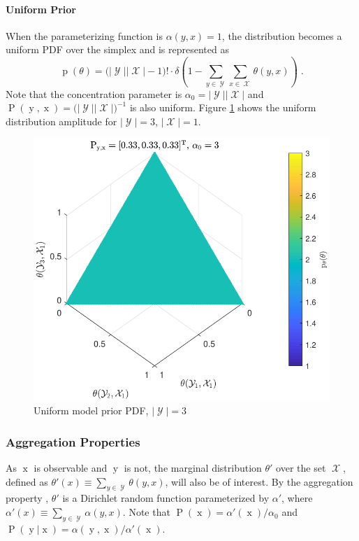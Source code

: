 \documentclass[12pt]{article}
\DeclareMathOperator{\xrm}{\mathrm{x}}
\DeclareMathOperator{\yrm}{\mathrm{y}}
\DeclareMathOperator{\Prm}{\mathrm{P}}
\DeclareMathOperator{\prm}{\mathrm{p}}
\DeclareMathOperator{\Xcal}{\mathcal{X}}
\DeclareMathOperator{\Ycal}{\mathcal{Y}}
\begin{document}
\paragraph{Uniform Prior}

When the parameterizing function is $\alpha(y,x) = 1$, the distribution becomes a uniform PDF over the simplex and is represented as
\begin{equation}
\prm(\theta) = \big( |\Ycal||\Xcal|-1 \big)! \cdot \delta \left( 1 - \sum_{y \in \Ycal} \sum_{x \in \Xcal}  \theta(y,x) \right) \;.
\end{equation}
Note that the concentration parameter is $\alpha_0 = |\Ycal||\Xcal|$ and $\Prm(\yrm,\xrm) = \big( |\Ycal||\Xcal| \big)^{-1}$ is also uniform. Figure \ref{fig:P_theta_uniform} shows the uniform distribution amplitude for $|\Ycal| = 3$, $|\Xcal| = 1$.

\begin{figure}
\centering
\includegraphics[scale=1.0]{P_theta_uniform.pdf}
\caption{Uniform model prior PDF, $|\Ycal| = 3$}
\label{fig:P_theta_uniform}
\end{figure}



\subsubsection*{Aggregation Properties}

As $\xrm$ is observable and $\yrm$ is not, the marginal distribution $\theta'$ over the set $\Xcal$, defined as $\theta'(x) \equiv \sum_{y \in \Ycal} \theta(y,x)$, will also be of interest. By the aggregation property \cite{ferguson}, $\theta'$ is a Dirichlet random function parameterized by $\alpha'$, where $\alpha'(x) \equiv \sum_{y \in \Ycal} \alpha(y,x)$. Note that $\Prm(\xrm) = \alpha'(\xrm) / \alpha_0$ and $\Prm(\yrm|\xrm) = \alpha(\yrm,\xrm) / \alpha'(\xrm)$. 
\end{document}
